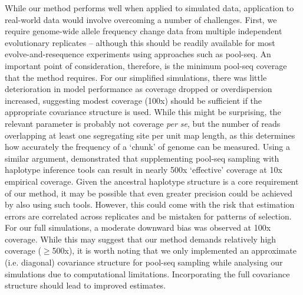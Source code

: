 \documentclass[12pt]{article}
\begin{document}
\begin{bibunit}
While our method performs well when applied to simulated data, application to real-world data would involve overcoming a number of challenges. First, we require genome-wide allele frequency change data from multiple independent evolutionary replicates -- although this should be readily available for most evolve-and-resequence experiments using approaches such as pool-seq. An important point of consideration, therefore, is the minimum pool-seq coverage that the method requires. For our simplified simulations, there was little deterioration in model performance as coverage dropped or overdispersion increased, suggesting modest coverage (100x) should be sufficient if the appropriate covariance structure is used. While this might be surprising, the relevant parameter is probably not coverage \emph{per se}, but the number of reads overlapping at least one segregating site per unit map length, as this determines how accurately the frequency of a `chunk' of genome can be measured. Using a similar argument, \citet{tilk2019accurate} demonstrated that supplementing pool-seq sampling with haplotype inference tools can result in nearly 500x `effective' coverage at 10x empirical coverage. Given the ancestral haplotype structure is a core requirement of our method, it may be possible that even greater precision could be achieved by also using such tools. However, this could come with the risk that estimation errors are correlated across replicates and be mistaken for patterns of selection. For our full simulations, a moderate downward bias was observed at 100x coverage. While this may suggest that our method demands relatively high coverage ($\geq$500x), it is worth noting that we only implemented an approximate (i.e. diagonal) covariance structure for pool-seq sampling while analysing our simulations due to computational limitations. Incorporating the full covariance structure should lead to improved estimates.


\end{bibunit}
\end{document}

